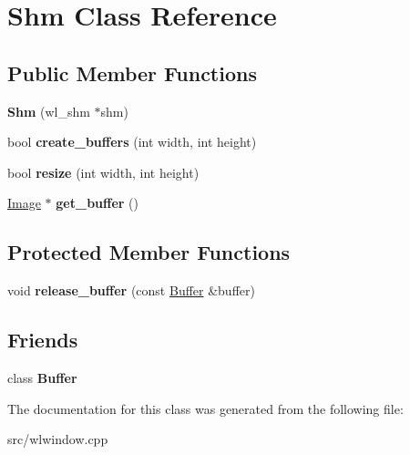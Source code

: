 \hypertarget{classShm}{}\section{Shm Class Reference}
\label{classShm}
\subsection*{Public Member Functions}
\begin{DoxyCompactItemize}
\item 
\mbox{\label{classShm_a53d1d5a5f8bb1e7935206564ae517d71}} 
{\bfseries Shm} (wl\+\_\+shm $\ast$shm)
\item 
\mbox{\label{classShm_a74dfe0b2288c8bbb1ae66f5366382b01}} 
bool {\bfseries create\+\_\+buffers} (int width, int height)
\item 
\mbox{\label{classShm_a0123fedcd35103631c05569d7b74879f}} 
bool {\bfseries resize} (int width, int height)
\item 
\mbox{\label{classShm_a9ff0172c16ddc33f9fbbf56492d523ba}} 
\mbox{\hyperlink{structImage}{Image}} $\ast$ {\bfseries get\+\_\+buffer} ()
\end{DoxyCompactItemize}
\subsection*{Protected Member Functions}
\begin{DoxyCompactItemize}
\item 
\mbox{\label{classShm_a30049f98192f15ce5c122fbb9eda51bc}} 
void {\bfseries release\+\_\+buffer} (const \mbox{\hyperlink{classBuffer}{Buffer}} \&buffer)
\end{DoxyCompactItemize}
\subsection*{Friends}
\begin{DoxyCompactItemize}
\item 
\mbox{\label{classShm_a5ba04a2bf0ca34a0f845cd759950664d}} 
class {\bfseries Buffer}
\end{DoxyCompactItemize}


The documentation for this class was generated from the following file\+:\begin{DoxyCompactItemize}
\item 
src/wlwindow.\+cpp\end{DoxyCompactItemize}
